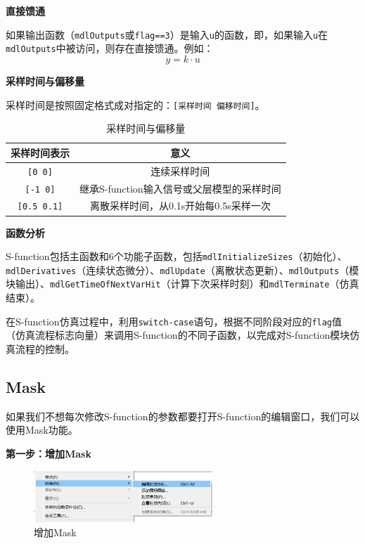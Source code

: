 \documentclass[12pt,a4paper,UTF8]{article}
\begin{document}
\textbf{直接馈通}

如果输出函数（\texttt{mdlOutputs}或\texttt{flag==3}）是输入\texttt{u}的函数，即，如果输入\texttt{u}在\texttt{mdlOutputs}中被访问，则存在直接馈通。例如：
\[ y = k \cdot u \]

\textbf{采样时间与偏移量}

采样时间是按照固定格式成对指定的：\texttt{[采样时间 偏移时间]}。

\begin{table}[h]
    \centering
    \begin{tabular}{|c|c|}
        \hline
        采样时间表示 & 意义 \\
        \hline
        \texttt{[0 0]} & 连续采样时间 \\
        \hline
        \texttt{[-1 0]} & 继承S-function输入信号或父层模型的采样时间 \\
        \hline
        \texttt{[0.5 0.1]} & 离散采样时间，从0.1s开始每0.5s采样一次 \\
        \hline
    \end{tabular}
    \caption{采样时间与偏移量}
\end{table}

\textbf{函数分析}

S-function包括主函数和6个功能子函数，包括\texttt{mdlInitializeSizes}（初始化）、\texttt{mdlDerivatives}（连续状态微分）、\texttt{mdlUpdate}（离散状态更新）、\texttt{mdlOutputs}（模块输出）、\texttt{mdlGetTimeOfNextVarHit}（计算下次采样时刻）和\texttt{mdlTerminate}（仿真结束）。

在S-function仿真过程中，利用\texttt{switch-case}语句，根据不同阶段对应的\texttt{flag}值（仿真流程标志向量）来调用S-function的不同子函数，以完成对S-function模块仿真流程的控制。

\subsection{Mask}

如果我们不想每次修改S-function的参数都要打开S-function的编辑窗口，我们可以使用Mask功能。

\textbf{第一步：增加Mask}

\begin{figure}[h]
    \centering
    \includegraphics[width=0.6\textwidth]{20241203115042.png}
    \caption{增加Mask}
\end{figure}
\end{document}
